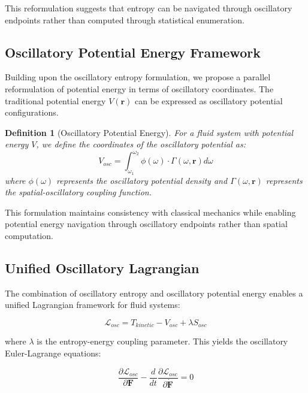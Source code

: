 \documentclass[12pt,a4paper]{article}
\newtheorem{definition}{Definition}
\begin{document}
This reformulation suggests that entropy can be navigated through oscillatory endpoints rather than computed through statistical enumeration.

\subsection{Oscillatory Potential Energy Framework}

Building upon the oscillatory entropy formulation, we propose a parallel reformulation of potential energy in terms of oscillatory coordinates. The traditional potential energy $V(\mathbf{r})$ can be expressed as oscillatory potential configurations.

\begin{definition}[Oscillatory Potential Energy]
For a fluid system with potential energy $V$, we define the coordinates of the oscillatory potential as:
\begin{equation}
V_{osc} = \int_{\omega_1}^{\omega_2} \phi(\omega) \cdot \Gamma(\omega, \mathbf{r}) d\omega
\end{equation}
where $\phi(\omega)$ represents the oscillatory potential density and $\Gamma(\omega, \mathbf{r})$ represents the spatial-oscillatory coupling function.
\end{definition}

This formulation maintains consistency with classical mechanics while enabling potential energy navigation through oscillatory endpoints rather than spatial computation.

\subsection{Unified Oscillatory Lagrangian}

The combination of oscillatory entropy and oscillatory potential energy enables a unified Lagrangian framework for fluid systems:

\begin{equation}
\mathcal{L}_{osc} = T_{kinetic} - V_{osc} + \lambda S_{osc}
\end{equation}

where $\lambda$ is the entropy-energy coupling parameter. This yields the oscillatory Euler-Lagrange equations:

\begin{equation}
\frac{\partial \mathcal{L}_{osc}}{\partial \mathbf{F}} - \frac{d}{dt}\frac{\partial \mathcal{L}_{osc}}{\partial \dot{\mathbf{F}}} = 0
\end{equation}
\end{document}
